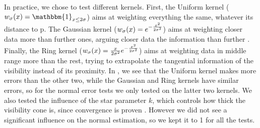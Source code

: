 In practice, we chose to test  different kernels. First, the Uniform
kernel ($\Kernel{x} = \mathbbm{1}_{x \leq 2\sigma}$) aims at weighting
everything the same, whatever its distance to p. The Gaussian kernel
($w_{\sigma}(x) = e^{-\frac{x^2}{2\sigma^2}}$) aims at weighting closer
data more than further ones, arguing closer data  the
information than further . Finally, the Ring kernel ($w_{\sigma}(x) =
\frac{x}{2\sigma^2}e^{-\frac{x^2}{2\sigma^2}}$) aims at weighting data
in middle range more than the rest, trying to extrapolate the
tangential information of the visibility instead of its
proximity. In , we see
that the Uniform kernel makes more errors than the other two,
while the Gaussian and Ring kernels have similar errors, so for the
normal error tests we only tested on the latter two kernels. We also
tested the influence of the star parameter $k$, which controls how
thick the visibility cone is, since convergence is proven . However\added[id=ROM]{,} we did not see a significant influence on
the normal estimation, so we kept it to 1 for all the tests.

